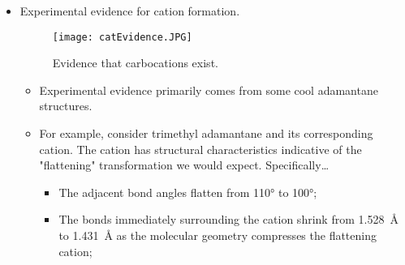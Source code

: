 \documentclass[../notes.tex]{subfiles}
\begin{document}
\begin{itemize}
    \begin{itemize}
        \item Figure \ref{fig:structureCation} depicts a methyl cation ().
        \item In general, cations are $sp^2$-hybridized, trigonal planar species.
        \begin{itemize}
            \item Recall that Figure \ref{fig:QmotCH3} explains why cations are trigonal planar instead of pyramidal.
        \end{itemize}
        \item The cationic charge is delocalized across the entire molecule, not localized on the carbon.
        \begin{itemize}
            \item Indeed, there is a $\delta^+$ on the 's, too.
            \item In fact, the dipole qualitatively points \emph{toward} the carbon.
            \item Quantitatively, the \textbf{Mulliken partial charges} are $+0.155$ on  and $+0.282$ on each . Together, these partial charges sum to the total charge of $+1$:
            \begin{equation*}
                1\times 0.155+3\times 0.282 \approx 1
            \end{equation*}
        \end{itemize}
    \end{itemize}
    \item Experimental evidence for cation formation.
    \begin{figure}[h!]
        \centering
        \texttt{[image: catEvidence.JPG]}
        \caption{Evidence that carbocations exist.}
        \label{fig:catEvidence}
    \end{figure}
    \begin{itemize}
        \item Experimental evidence primarily comes from some cool adamantane structures.
        \item For example, consider trimethyl adamantane and its corresponding cation. The cation has structural characteristics indicative of the "flattening" transformation we would expect. Specifically\dots
        \begin{itemize}
            \item The adjacent bond angles flatten from \ang{110} to \ang{100};
            \item The bonds immediately surrounding the cation shrink from \SI{1.528}{\angstrom} to \SI{1.431}{\angstrom} as the molecular geometry compresses the flattening cation;

\end{itemize}
\end{itemize}
\end{itemize}
\end{document}
